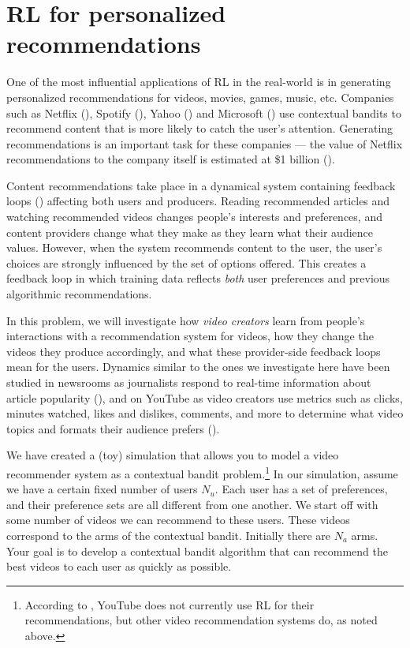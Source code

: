 \section{RL for personalized recommendations}

One of the most influential applications of RL in the real-world is in generating personalized recommendations for videos, movies, games, music, etc. Companies such as Netflix (\cite{netflix_slides}), Spotify (\cite{spotify_recs}), Yahoo (\cite{li2010contextual}) and Microsoft (\cite{swaminathan2017offpolicy}) use contextual bandits to recommend content that is more likely to catch the user's attention. Generating recommendations is an important task for these companies --- the value of Netflix recommendations to the company itself is estimated at \$1 billion (\cite{netflix_recs}).

\noindent
Content recommendations take place in a dynamical system containing feedback loops (\cite{Beer1995}) affecting both users and producers. Reading recommended articles and watching recommended videos changes people's interests and preferences, and content providers change what they make as they learn what their audience values.  However, when the system recommends content to the user, the user's choices are strongly influenced by the set of options offered. This creates a feedback loop in which training data reflects \textit{both} user preferences and previous algorithmic recommendations. 

\noindent
In this problem, we will investigate how \textit{video creators} learn from people's interactions with a recommendation system for videos, how they change the videos they produce accordingly, and what these provider-side feedback loops mean for the users. Dynamics similar to the ones we investigate here have been studied in newsrooms as journalists respond to real-time information about article popularity (\cite{Christin2018}), and on YouTube as video creators use metrics such as clicks, minutes watched, likes and dislikes, comments, and more to determine what video topics and formats their audience prefers (\cite{Christin2021}). 

\noindent
We have created a (toy) simulation that allows you to model a video recommender system as a contextual bandit problem.\footnote{According to \cite{45530}, YouTube does not currently use RL for their recommendations, but other video recommendation systems do, as noted above.} In our simulation, assume we have a certain fixed number of users $N_u$. Each user has a set of preferences, and their preference sets are all different from one another. We start off with some number of videos we can recommend to these users. These videos correspond to the arms of the contextual bandit. Initially there are $N_a$ arms. Your goal is to develop a contextual bandit algorithm that can recommend the best videos to each user as quickly as possible. 
 

